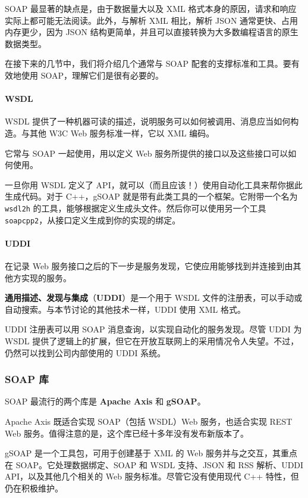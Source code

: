 SOAP 最显著的缺点是，由于数据量大以及 XML 格式本身的原因，请求和响应实际上都可能无法阅读。此外，与解析 XML 相比，解析 JSON 通常更快、占用内存更少，因为 JSON 结构更简单，并且可以直接转换为大多数编程语言的原生数据类型。

在接下来的几节中，我们将介绍几个通常与 SOAP 配套的支撑标准和工具。要有效地使用 SOAP，理解它们是很有必要的。

\paragraph{WSDL}

\label{idx:1602}
WSDL 提供了一种机器可读的描述，说明服务可以如何被调用、消息应当如何构造。与其他 W3C Web 服务标准一样，它以 XML 编码。

它常与 SOAP 一起使用，用以定义 Web 服务所提供的接口以及这些接口可以如何使用。

\label{idx:1603}
一旦你用 WSDL 定义了 API，就可以（而且应该！）使用自动化工具来帮你据此生成代码。对于 C++，gSOAP 就是带有此类工具的一个框架。它附带一个名为 \texttt{wsdl2h} 的工具，能够根据定义生成头文件。然后你可以使用另一个工具 \texttt{soapcpp2}，从接口定义生成到你的实现的绑定。

\paragraph{UDDI}

\label{idx:1604}
在记录 Web 服务接口之后的下一步是服务发现，它使应用能够找到并连接到由其他方实现的服务。

\label{idx:1605}
\textbf{通用描述、发现与集成}（\textbf{UDDI}）是一个用于 WSDL 文件的注册表，可以手动或自动搜索。与本节讨论的其他技术一样，UDDI 使用 XML 格式。

UDDI 注册表可以用 SOAP 消息查询，以实现自动化的服务发现。尽管 UDDI 为 WSDL 提供了逻辑上的扩展，但它在开放互联网上的采用情况令人失望。不过，仍然可以找到公司内部使用的 UDDI 系统。

\subsubsection{SOAP 库}

SOAP 最流行的两个库是 \textbf{Apache Axis} 和 \textbf{gSOAP}。

\label{idx:1606}
\label{idx:1607}
Apache Axis 既适合实现 SOAP（包括 WSDL）Web 服务，也适合实现 REST Web 服务。值得注意的是，这个库已经十多年没有发布新版本了。

\label{idx:1608}
gSOAP 是一个工具包，可用于创建基于 XML 的 Web 服务并与之交互，其重点在 SOAP。它处理数据绑定、SOAP 和 WSDL 支持、JSON 和 RSS 解析、UDDI API，以及其他几个相关的 Web 服务标准。尽管它没有使用现代 C++ 特性，但仍在积极维护。

